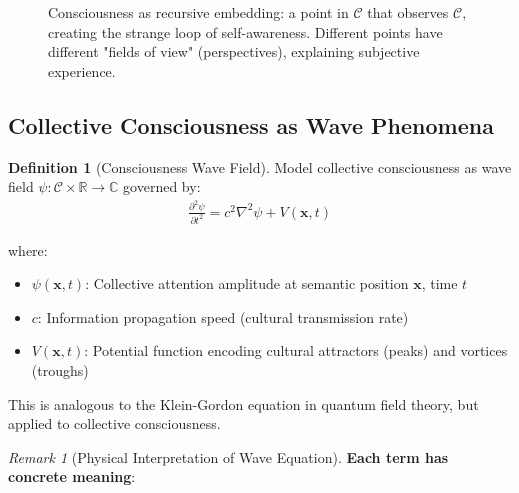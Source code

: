 \documentclass[11pt,a4paper]{article}
\theoremstyle{definition}
\newtheorem{definition}{Definition}[section]
\theoremstyle{remark}
\newtheorem{remark}{Remark}[section]
\newcommand{\RR}{\mathbb{R}}
\newcommand{\CC}{\mathcal{C}}
\begin{document}
\begin{small}
\begin{figure}[H]
\caption{Consciousness as recursive embedding: a point in \(\CC\) that observes \(\CC\), creating the strange loop of self-awareness. Different points have different "fields of view" (perspectives), explaining subjective experience.}
\label{fig:recursive_consciousness}
\end{figure}

\subsection{Collective Consciousness as Wave Phenomena}

\begin{definition}[Consciousness Wave Field]
Model collective consciousness as wave field \(\psi: \CC \times \RR \rightarrow \mathbb{C}\) governed by:
\begin{align}
\frac{\partial^2 \psi}{\partial t^2} = c^2 \nabla^2 \psi + V(\mathbf{x}, t)
\end{align}

where:
\begin{itemize}
\item \(\psi(\mathbf{x}, t)\): Collective attention amplitude at semantic position \(\mathbf{x}\), time \(t\)
\item \(c\): Information propagation speed (cultural transmission rate)
\item \(V(\mathbf{x}, t)\): Potential function encoding cultural attractors (peaks) and vortices (troughs)
\end{itemize}

This is analogous to the Klein-Gordon equation in quantum field theory, but applied to collective consciousness.
\end{definition}

\begin{remark}[Physical Interpretation of Wave Equation]
\textbf{Each term has concrete meaning}:


\end{remark}
\end{small}
\end{document}
